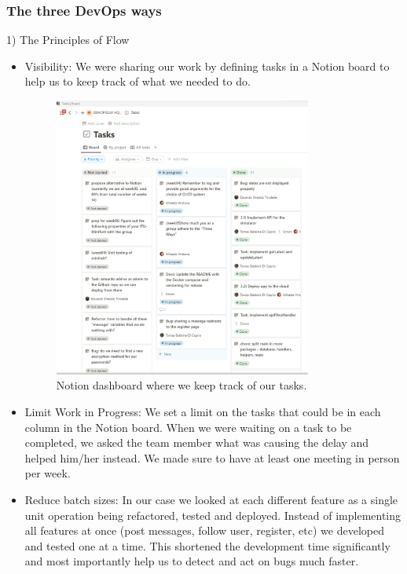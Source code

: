 \documentclass{article}
\begin{document}
\subsubsection{The three DevOps ways}
1) The Principles of Flow
\begin{itemize}
    \item Visibility: We were sharing our work by defining tasks in a Notion board to help us to keep track of what we needed to do.

    \begin{figure}[ht]
        \centering
        \includegraphics[width=0.8\textwidth]{./images/notion-dashboard-visibility-three-ways.png}
        \caption{Notion dashboard where we keep track of our tasks.}
        \label{fig:notion-dashboard}
    \end{figure}

    \item Limit Work in Progress: We set a limit on the tasks that could be in each column in the Notion board. When we were waiting on a task to be completed, we asked the team member what was causing the delay and helped him/her instead. We made sure to have at least one meeting in person per week.
    
    \item Reduce batch sizes: In our case we looked at each different feature as a single unit operation being refactored, tested and deployed. Instead of implementing all features at once (post messages, follow user, register, etc) we developed and tested one at a time. This shortened the development time significantly and most importantly help us to detect and act on bugs much faster.
\end{itemize}
\end{document}
